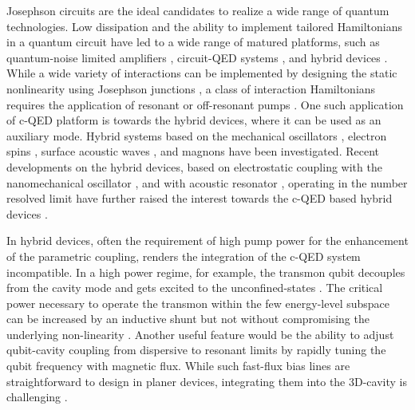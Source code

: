\documentclass[a4paper, amsfonts, amssymb, amsmath, reprint,showkeys,nofootinbib,superscriptaddress]{revtex4-2}
\begin{document}
\maketitle



Josephson circuits are the ideal candidates to realize a wide range of 
quantum technologies.
%
Low dissipation and the ability to implement tailored Hamiltonians 
in a quantum circuit have led to a wide range of matured platforms, 
such as quantum-noise limited amplifiers \cite{castellanos-beltran_widely_2007,yamamoto_flux-driven_2008,macklin_nearquantum-limited_2015}, 
circuit-QED systems \cite{devoret_implementing_2004,blais_quantum-information_2007}, 
and hybrid devices \cite{clerk_hybrid_2020}.
%
While a wide variety of interactions can be implemented by designing the static 
nonlinearity using Josephson junctions \cite{buluta_natural_2011, xiang_hybrid_2013},
a class of interaction Hamiltonians requires the application of 
resonant or off-resonant pumps \cite{flurin_generating_2012,abdo_full_2013,leghtas_confining_2015}.
%
One such application of c-QED platform is towards the hybrid devices, where it
can be used as an auxiliary mode.
%
Hybrid systems based on the mechanical oscillators \cite{lahaye_nanomechanical_2009, 
	oconnell_quantum_2010, lecocq_resolving_2015, pirkkalainen_hybrid_2013}, 
electron spins \cite{zhu_coherent_2011, kubo_hybrid_2011}, surface acoustic waves 
\cite{gustafsson_propagating_2014, manenti_circuit_2017, bolgar_quantum_2018}, and magnons 
\cite{tabuchi_coherent_2015} have been investigated. 
%
Recent developments on the hybrid devices, based on electrostatic 
coupling with the nanomechanical oscillator \cite{viennot_phonon-number-sensitive_2018}, 
and with acoustic resonator \cite{chu_creation_2018,arrangoiz-arriola_resolving_2019}, 
operating in the number resolved limit have further raised the interest 
towards the c-QED based hybrid devices \cite{clerk_hybrid_2020}.


%
In hybrid devices, often the requirement of high pump power for the enhancement of the parametric coupling, renders
the integration of the c-QED system incompatible. 
%
In a high power regime, for example, the transmon qubit decouples 
from the cavity mode and gets excited to the unconfined-states \cite{lescanne_escape_2019}.
%
The critical power necessary to operate the transmon within the few energy-level 
subspace can be increased by an inductive shunt but not without compromising 
the underlying non-linearity \cite{verney_structural_2019}.
%
Another useful feature would be the ability to adjust qubit-cavity coupling from 
dispersive to resonant limits by rapidly tuning the qubit frequency with magnetic 
flux. While such fast-flux bias lines are straightforward to design in planer 
devices, integrating them into the 3D-cavity is challenging
\cite{gargiulo_fast_2021, reshitnyk_3d_2016}.
\end{document}
